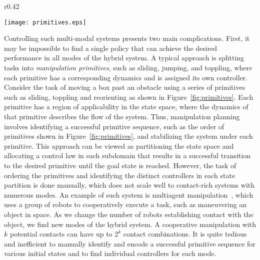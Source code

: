 \begin{wrapfigure}{r}{0.42\textwidth}
    \vspace{-9mm}
     \begin{center}
     \texttt{[image: primitives.eps]}
     \vspace{-5mm}
     \end{center}
     \vspace{-2mm}
     \caption{Manipulation primitive sequence for manuvering a box past an obstacle}
     \label{fig:primitives}
     \vspace{-5mm}
\end{wrapfigure}
%
Controlling such multi-modal systems presents two main complications. 
%
First, it may be impossible to find a single policy that can achieve the desired
performance in all modes of the hybrid system.
%
A typical approach is splitting tasks into \textit{manipulation
primitives}\cite{nonprehensile_survey,rodyman,lynch2003control}, such as
sliding, jumping, and toppling, where each primitive has a corresponding
dynamics and is assigned its own controller. 
%
Consider the task of moving a box past an obstacle using a series of primitives
such as sliding, toppling and reorienting as shown in
Figure~\ref{fig:primitives}.
%
Each primitive has a region of applicability in the state space, where the
dynamics of that primitive describes the flow of the
system\cite{lynch1999dynamic}.
%
Thus, manipulation planning involves identifying a successful primitive
sequence, such as the order of primitives shown in Figure~\ref{fig:primitives},
and stabilizing the system under each
primitive\cite{erdmann1998exploration,yashima2003randomized}.  
%
This approach can be viewed as partitioning the state space and allocating a
control law in each subdomain that results in a successful transition to the
desired primitive until the goal state is reached\cite{woodruff2017planning}.
%
However, the task of ordering the primitives and identifying the distinct
controllers in each state partition is done
manually\cite{erdmann1998exploration,woodruff2017planning}, which does not scale
well to contact-rich systems with numerous modes. 
%
An example of such system is multiagent
manipulation~\cite{ashenafi2021nonholonomic}, which uses a group of robots to
cooperatively execute a task, such as maneuvering an object in space. 
%
As we change the number of robots establishing contact with the object, we find
new modes of the hybrid system.
%
A cooperative manipulation with $k$ potential contacts can have up to $2^k$
contact combinations. 
%
It is quite tedious and inefficient to manually identify and encode a successful
primitive sequence for various initial states and to find individual controllers
for each mode. 
%

